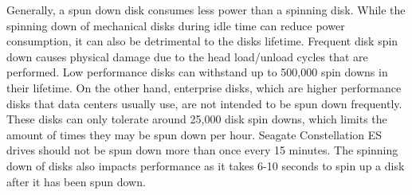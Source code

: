 Generally, a spun down disk consumes less power than a spinning disk. While the
spinning down of mechanical disks during idle time can reduce power consumption,
it can also be detrimental to the disks lifetime. Frequent disk spin down causes
physical damage due to the head load/unload cycles that are performed. Low
performance disks can withstand up to 500,000 spin downs in their lifetime. On
the other hand, enterprise disks, which are higher performance disks that data
centers usually use, are not intended to be spun down frequently. These disks
can only tolerate around 25,000 disk spin downs, which limits the amount of
times they may be spun down per hour. Seagate Constellation ES drives should not
be spun down more than once every 15 minutes.  The spinning down of disks also
impacts performance as it takes 6-10 seconds to spin up a disk after it has been
spun down.
